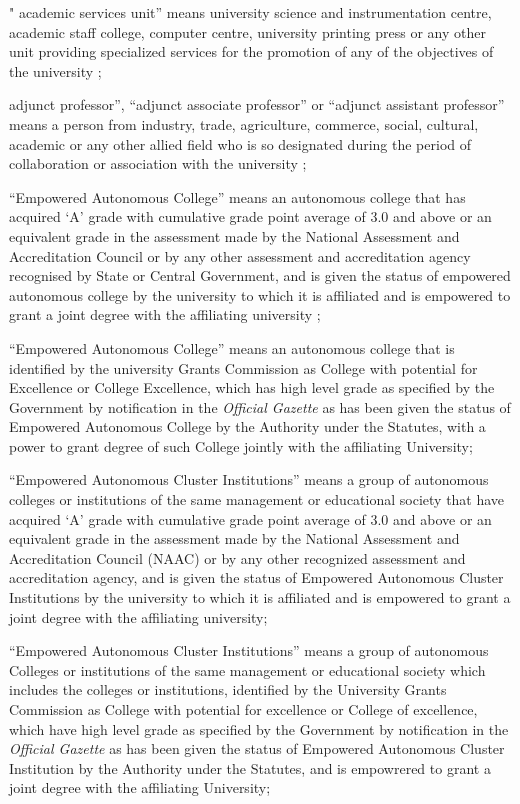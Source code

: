 \documentclass[default]{mhact}
\begin{document}
      \begin{subsectionlist}
    

" academic services unit'' means university science and instrumentation centre, academic staff college, computer centre, university printing press or any other unit providing specialized services for the promotion of any of the objectives of the university ;


adjunct professor'', ``adjunct associate professor'' or ``adjunct assistant professor'' means a person from industry, trade, agriculture, commerce, social, cultural, academic or any other allied field who is so designated during the period of collaboration or association with the university ;


``Empowered Autonomous College'' means an autonomous college that has acquired `A' grade with cumulative grade point average of 3.0 and above or an equivalent grade in the assessment made by the National Assessment and Accreditation Council or by any other assessment and accreditation agency recognised by State or Central Government, and is given the status of empowered autonomous college by the university to which it is affiliated and is empowered to grant a joint degree with the affiliating university ;


``Empowered Autonomous College'' means an autonomous college that is identified by the university Grants Commission as College with potential for Excellence or College Excellence, which has high level grade as specified by the Government by notification in the \emph{Official Gazette} as has been given the status of Empowered Autonomous College by the Authority under the Statutes, with a power to grant degree of such College jointly with the affiliating University;


``Empowered Autonomous Cluster Institutions'' means a group of autonomous colleges or institutions of the same management or educational society that have acquired `A' grade with cumulative grade point average of 3.0 and above or an equivalent grade in the assessment made by the National Assessment and Accreditation Council (NAAC) or by any other recognized assessment and accreditation agency, and is given the status of Empowered Autonomous Cluster Institutions by the university to which it is affiliated and is empowered to grant a joint degree with the affiliating university;


``Empowered Autonomous Cluster Institutions'' means a group of autonomous Colleges or institutions of the same management or educational society which includes the colleges or institutions, identified by the University Grants Commission as College with potential for excellence or College of excellence, which have high level grade as specified by the Government by notification in the \emph{Official Gazette} as has been given the status of Empowered Autonomous Cluster Institution by the Authority under the Statutes, and is empowrered to grant a joint degree with the affiliating University;

       \end{subsectionlist}
    
\end{document}
